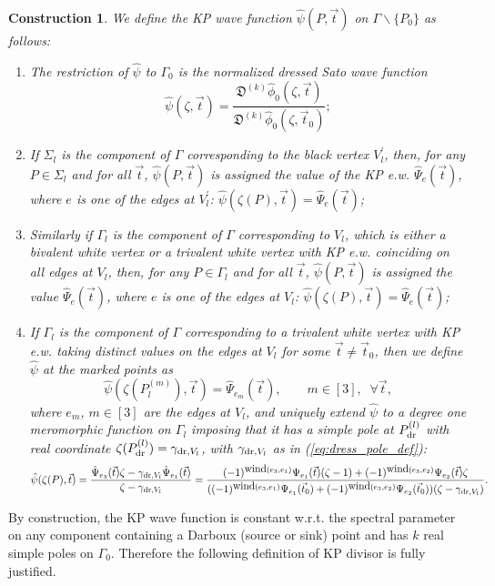 \documentclass[11pt]{amsart}
\theoremstyle{plain}
\numberwithin{equation}{section}
\newtheorem{construction}{Construction}[subsection]
\def \gdr {\gamma_{\textup{\scriptsize dr},V_l}}
\begin{document}
\begin{construction}
We define the KP wave function $\hat \psi (P, \vec t)$ on $\Gamma\backslash \{P_0\}$ as follows:
\begin{enumerate}
\item The restriction of ${\hat \psi}$ to $\Gamma_{0}$ is the normalized dressed Sato wave function 
\[
{\hat \psi} (\zeta, \vec t) = \frac{{\mathfrak D}^{(k)} {\hat \phi}_0 (\zeta, \vec t)}{{\mathfrak D}^{(k)} {\hat \phi}_0 (\zeta, \vec t_0)};
\]
\item If $\Sigma_l$ is the component of $\Gamma$ corresponding to the black vertex $V^{\prime}_l$, then, for any $P\in \Sigma_l$ and for all $\vec t$, ${\hat \psi} (P, \vec t)$ is assigned the value of the KP e.w. $\hat \Psi_{e} (\vec t)$, where $e$ is one of the edges at $V^{\prime}_l$:
${\hat \psi} (\zeta(P), \vec t) = \hat \Psi_{e} (\vec t)$;
\item\label{it:non_int_dress} Similarly if $\Gamma_{l}$ is the component of $\Gamma$ corresponding to $V_{l}$, which is either a bivalent white vertex or a trivalent white vertex with KP e.w. coinciding on all edges at $V_l$, then, for any $P\in \Gamma_{l}$ and for all $\vec t$, ${\hat \psi} (P, \vec t)$ is assigned the value $\hat \Psi_{e} (\vec t)$, where $e$ is one of the  edges at $V_{l}$: ${\hat \psi} (\zeta(P), \vec t) = \hat \Psi_{e} (\vec t)$;
\item\label{it:int_dress} If $\Gamma_{l}$ is the component of $\Gamma$ corresponding to a trivalent white vertex with KP e.w. taking distinct values on the edges at $V_l$ for some $\vec t\not=\vec t_0$, then we define $\hat \psi$ at the marked points as
\[
{\hat \psi} (\zeta(P^{(m)}_{l}), \vec t) = \hat \Psi_{e_m} (\vec t), \quad \quad m\in [3],\;\; \forall \vec t,
\]
where $e_m$, $m\in [3]$ are the edges at $V_{l}$, and 
uniquely extend $\hat \psi$ to a degree one meromorphic function on $\Gamma_{l}$ imposing that it has a simple pole at $P_{\textup{\scriptsize dr}}^{(l)}$ with real coordinate $\zeta (P_{\textup{\scriptsize dr}}^{(l)})=\gamma_{\textup{\scriptsize dr}, V_l}$, with $\gdr$ as in (\ref{eq:dress_pole_def}):
\begin{equation}\label{eq:99}
{\hat \psi} (\zeta(P), \vec t) = \frac{\hat \Psi_{e_3} (\vec t) \zeta - \gdr\hat \Psi_{e_1} (\vec t) }{ \zeta- \gdr}= \frac{(-1)^{\mbox{wind}(e_3,e_1)} \Psi_{e_1} (\vec t) (\zeta -1) + (-1)^{\mbox{wind}(e_3,e_2)} \Psi_{e_2} (\vec t)\zeta}{((-1)^{\mbox{wind}(e_3,e_1)} \Psi_{e_1} (\vec t_0)+ (-1)^{\mbox{wind}(e_3,e_2)} \Psi_{e_2} (\vec t_0))(\zeta - \gdr)}.
\end{equation}
\end{enumerate}
\end{construction}
By construction, the KP wave function is constant w.r.t. the spectral parameter on any component containing a Darboux (source or sink) point and has $k$ real simple poles on $\Gamma_0$. Therefore the following definition of KP divisor is fully justified.
\end{document}
